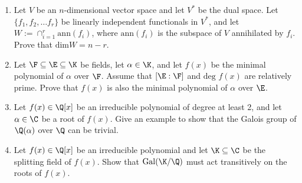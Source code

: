 \documentclass[12pt]{article}
\begin{document}
\begin{enumerate}
\item Let $V$ be an $n$-dimensional vector space and let $V^*$ be the
dual space.  Let $\{f_1,f_2,\ldots f_r\}$ be linearly independent
functionals
in $V^*$, and let $W:=\cap  _{i=1}^r\mbox{ann}({f_i})$, where
$\mbox{ann}({f_i})$
is the subspace of $V$ annihilated by $f_i$.  Prove that $\mbox{dim
}W=n-r.$

\item Let ${\F}\subseteq {\E}\subseteq {\K}$ be fields,
let $\alpha\in {\K}$, and let $f(x)$ be the minimal polynomial of
$\alpha $ over ${\F}$.  Assume that $[{\E}:{\F}]$ and
$\mbox{deg }f(x)$ are relatively prime. Prove that $f(x)$ is also the
minimal polynomial of $\alpha $ over ${\E}$.

\item Let $f(x)\in\Q[x]$ be an irreducible polynomial 
of degree at least 2, and let 
$\alpha\in\C$ be a root of $f(x)$. Give an example to show that
the Galois group of $\Q(\alpha)$ over $\Q$ can be trivial.

\item Let $f(x)\in\Q[x]$ be an irreducible polynomial and let
$\K\subseteq \C$ be the splitting field of $f(x)$. Show that
${\rm Gal}(\K/\Q)$ must act transitively on the roots of $f(x)$.






    
\end{enumerate}
\end{document}
